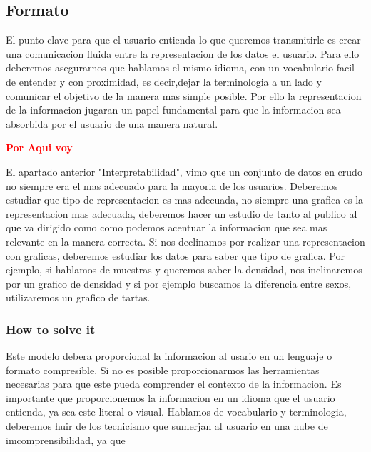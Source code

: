 \subsection{Formato}
El punto clave para que el usuario entienda lo que queremos transmitirle es crear una comunicacion fluida entre la representacion
de los datos el usuario. Para ello  deberemos asegurarnos que hablamos el mismo idioma, con un vocabulario facil de entender y
con proximidad, es decir,dejar la terminologia a un lado y comunicar el objetivo de la manera mas simple posible.
Por ello la representacion de la informacion jugaran un papel fundamental para que la 
informacion sea absorbida por el usuario de una manera natural.

\textcolor{red}{\textbf{Por Aqui voy}}

El apartado anterior "Interpretabilidad", vimo que un conjunto de datos en crudo no siempre era el mas adecuado para la mayoria de los usuarios.
Deberemos estudiar que tipo de representacion es mas adecuada, no siempre una grafica es la representacion mas adecuada, deberemos hacer un 
estudio de tanto al publico al que va dirigido como como podemos acentuar la informacion que sea mas relevante en la manera 
correcta.
Si nos declinamos por realizar una representacion con graficas, deberemos estudiar los datos para saber que tipo de grafica. Por ejemplo, si hablamos de muestras y queremos saber la 
densidad, nos inclinaremos por un grafico de densidad y si por ejemplo buscamos la diferencia entre sexos, utilizaremos un grafico de tartas.



\subsubsection{How to solve it} 
Este modelo debera proporcional la informacion al usario en un lenguaje o formato compresible. Si no es posible proporcionarmos las herramientas necesarias para que este pueda 
comprender el contexto de la informacion.
Es importante que proporcionemos la informacion en un idioma que el usuario entienda, ya sea este literal o visual.
Hablamos de vocabulario y terminologia, deberemos huir de los tecnicismo que sumerjan al usuario en una nube de 
imcomprensibilidad, ya que

